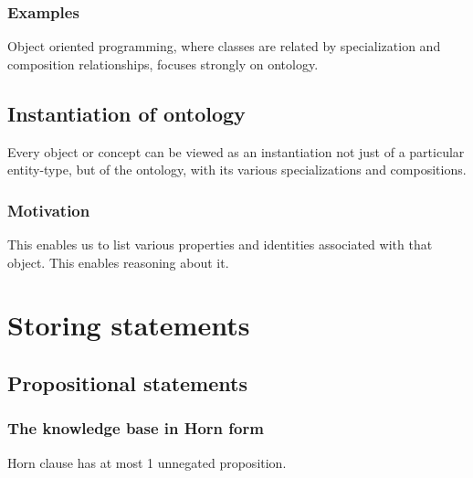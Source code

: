 \documentclass[oneside, article]{memoir}
\begin{document}
\subsection{Examples}
Object oriented programming, where classes are related by specialization and composition relationships, focuses strongly on ontology.

\section{Instantiation of ontology}
Every object or concept can be viewed as an instantiation not just of a particular entity-type, but of the ontology, with its various specializations and compositions.

\subsection{Motivation}
This enables us to list various properties and identities associated with that object. This enables reasoning about it.


\chapter{Storing statements}
\section{Propositional statements}
\subsection{The knowledge base in Horn form}
Horn clause has at most 1 unnegated proposition.
\tbc



\end{document}
